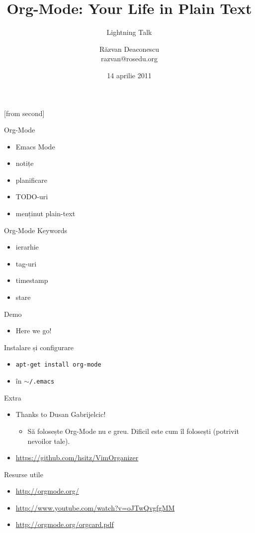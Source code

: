 \documentclass{beamer}
\title[Org-Mode]{Org-Mode: Your Life in Plain Text}
\subtitle{Lightning Talk}
\institute{Întâlnirile RLUG -- Aprilie 2011}
\author[Răzvan Deaconescu]{Răzvan Deaconescu\\
	razvan@rosedu.org}
\date{14 aprilie 2011}
\begin{document}
[from second]

\frame{\titlepage}

\begin{frame}{Org-Mode}
  \begin{itemize}
    \item Emacs Mode
    \item notițe
    \item planificare
    \item TODO-uri
    \item menținut plain-text
  \end{itemize}
\end{frame}

\begin{frame}{Org-Mode Keywords}
  \begin{itemize}
    \item ierarhie
    \item tag-uri
    \item timestamp
    \item stare
  \end{itemize}
\end{frame}

\begin{frame}{Demo}
  \begin{itemize}
    \item Here we go!
  \end{itemize}
\end{frame}

\begin{frame}{Instalare și configurare}
  \begin{itemize}
    \item \texttt{apt-get install org-mode}
    \item în \texttt{$\sim$/.emacs}
      \begin{beamerboxesrounded}[lower=block body,shadow=true]{}
        \scriptsize 
      \end{beamerboxesrounded}
  \end{itemize}
\end{frame}

\begin{frame}{Extra}
  \begin{itemize}
    \item Thanks to Dusan Gabrijelcic!
      \begin{itemize}
        \item Să folosește Org-Mode nu e greu. Dificil este cum îl folosești
        (potrivit nevoilor tale).
      \end{itemize}
    \item \url{https://github.com/hsitz/VimOrganizer}
  \end{itemize}
\end{frame}

\begin{frame}{Resurse utile}
	\begin{itemize}
        \item \url{http://orgmode.org/}
		\item \url{http://www.youtube.com/watch?v=oJTwQvgfgMM}
        \item \url{http://orgmode.org/orgcard.pdf}
    \end{itemize}
\end{frame}
\end{document}
